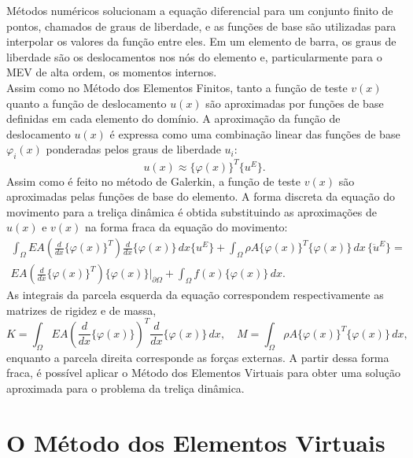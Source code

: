 \indent Métodos numéricos solucionam a equação diferencial para um conjunto finito de pontos, chamados de graus de liberdade, e as funções de base são utilizadas para interpolar os valores da função entre eles. Em um elemento de barra, os graus de liberdade são os deslocamentos nos nós do elemento e, particularmente para o MEV de alta ordem, os momentos internos.\\
\indent Assim como no Método dos Elementos Finitos, tanto a função de teste $v(x)$ quanto a função de deslocamento $u(x)$ são aproximadas por funções de base definidas em cada elemento do domínio. A aproximação da função de deslocamento $u(x)$ é expressa como uma combinação linear das funções de base $\varphi_i(x)$ ponderadas pelos graus de liberdade $u_i$:
\begin{equation}
    u(x) \approx \{\varphi(x)\}^T \{u^E\}.
\end{equation}
Assim como é feito no método de Galerkin, a função de teste $v(x)$ são aproximadas pelas funções de base do elemento. A forma discreta da equação do movimento para a treliça dinâmica é obtida substituindo as aproximações de $u(x)$ e $v(x)$ na forma fraca da equação do movimento:
\begin{equation}
    \begin{split}
        \int_{\Omega} EA \left(\frac{d}{dx}\{\varphi(x)\}^T\right) \frac{d}{dx}\{\varphi(x)\} \, dx \{u^E\} + \int_{\Omega} \rho A \{\varphi(x)\}^T \{\varphi(x)\} \, dx \, \{\ddot{u}^E\} = \\ EA\left(\frac{d}{dx}\{\varphi(x)\}^T\right) \{\varphi(x)\} \Big|_{\partial \Omega} + \int_{\Omega} f(x) \{\varphi(x)\} \, dx.
    \end{split}
\end{equation}
\indent As integrais da parcela esquerda da equação correspondem respectivamente as matrizes de rigidez e de massa, 
\begin{equation}
    K = \int_{\Omega} EA \left(\frac{d}{dx}\{\varphi(x)\}\right)^T \frac{d}{dx}\{\varphi(x)\} \, dx, \quad M = \int_{\Omega} \rho A \{\varphi(x)\}^T \{\varphi(x)\} \, dx,
\end{equation}
enquanto a parcela direita corresponde as forças externas. A partir dessa forma fraca, é possível aplicar o Método dos Elementos Virtuais para obter uma solução aproximada para o problema da treliça dinâmica.\\

\section{O Método dos Elementos Virtuais}

